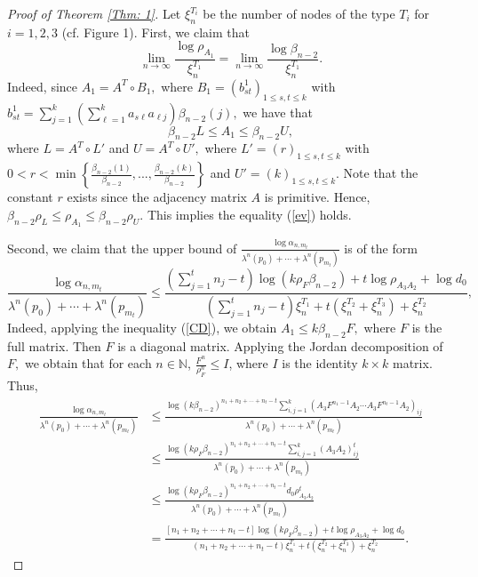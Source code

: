 \documentclass{amsart}
\theoremstyle{definition}
\begin{document}
\begin{proof}[Proof of Theorem \ref{Thm: 1}]
Let $\xi_n^{T_i}$ be the number of nodes of the type $T_i$ for $i=1,2,3$ (cf. Figure 1). First, we claim that
\begin{equation}\label{ev}
    \lim\limits_{n\rightarrow \infty}\frac{\log\rho_{A_1}}{\xi_n^{T_1}}=\lim\limits_{n\rightarrow \infty}\frac{\log\beta_{n-2}}{\xi_n^{T_1}}.
\end{equation}
Indeed, since $A_1=A^T\circ B_1,$ where $B_1=(b_{st}^1)_{1\leq s,t\leq k}$ with $b_{st}^1=\sum_{j=1}^k(\sum_{\ell=1}^k a_{s\ell}a_{\ell j})\beta_{n-2}(j),$ we have that 
\begin{equation}\label{CD}
    \beta_{n-2}L\leq A_1\leq \beta_{n-2}U,
\end{equation}
where $L=A^T\circ L'$ and $U=A^T\circ U',$ where $L'=(r)_{1\leq s,t\leq k}$ with $0<r<\min\left\{\frac{\beta_{n-2}(1)}{\beta_{n-2}},...,\frac{\beta_{n-2}(k)}{\beta_{n-2}}\right\}$ and $U'=(k)_{1\leq s,t\leq k}.$ Note that the constant $r$ exists since the adjacency matrix $A$ is primitive. Hence, $\beta_{n-2}\rho_{L}\leq \rho_{A_1}\leq \beta_{n-2}\rho_U.$ This implies the equality (\ref{ev}) holds.

Second, we claim that the upper bound of $\frac{\log \alpha_{n,m_t}}{\lambda^n(p_0)+\cdots +\lambda^n(p_{m_t})}$ is of the form
\begin{equation}
    \frac{\log \alpha_{n,m_t}}{\lambda^n(p_0)+\cdots +\lambda^n(p_{m_t})}\leq \frac{\left(\sum_{j=1}^tn_j-t\right)\log(k\rho_F\beta_{n-2})+t\log \rho_{A_3A_2}+\log d_0}{\left(\sum_{j=1}^tn_j-t\right) \xi_n^{T_1}+t(\xi_n^{T_2}+\xi_n^{T_3})+\xi_n^{T_2}},
\label{upper}
\end{equation}
Indeed, applying the inequality (\ref{CD}), we obtain $A_1\leq k\beta_{n-2}F,$ where $F$ is the full matrix. Then $F$ is a diagonal matrix. Applying the Jordan decomposition of $F,$ we obtain that for each $n\in\mathbb{N}$, $\frac{F^n}{\rho_F^n}\leq I$, where $I$ is the identity $k\times k$ matrix. Thus,
\begin{align*}
\frac{\log \alpha_{n,m_t}}{\lambda^n(p_0)+\cdots +\lambda^n(p_{m_t})}&\leq \frac{\log(k\beta_{n-2})^{n_1+n_2+\cdots +n_t-t}\sum_{i,j=1}^k(A_3F^{n_1-1}A_2\cdots A_3F^{n_t-1}A_2)_{ij}}{\lambda^n(p_0)+\cdots +\lambda^n(p_{m_t})}\\
&\leq \frac{\log(k\rho_F\beta_{n-2})^{n_1+n_2+\cdots +n_t-t}\sum_{i,j=1}^k(A_3A_2)^t_{ij}}{\lambda^n(p_0)+\cdots +\lambda^n(p_{m_t})}\\
&\leq \frac{\log(k\rho_F\beta_{n-2})^{n_1+n_2+\cdots +n_t-t} d_0\rho_{A_3A_2}^t}{\lambda^n(p_0)+\cdots +\lambda^n(p_{m_t})}\\
&=\frac{[n_1+n_2+\cdots +n_t-t]\log (k\rho_F\beta_{n-2})+t\log \rho_{A_3A_2}+\log d_0}{(n_1+n_2+\cdots +n_t-t) \xi_n^{T_1}+t(\xi_n^{T_2}+\xi_n^{T_3})+\xi_n^{T_2}}.
\end{align*}
 

\end{proof}
\end{document}
